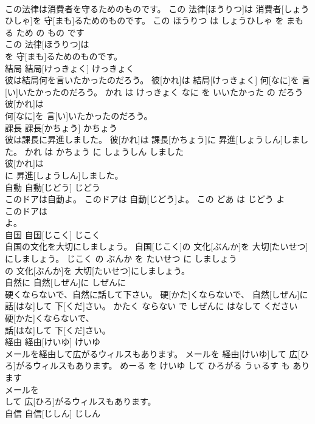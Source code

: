 \documentclass[8pt]{extreport}
\begin{document}
\begin{CJK}{UTF8}{min}
\\	この法律は消費者を守るためのものです。	この 法律[ほうりつ]は 消費者[しょうひしゃ]を 守[まも]るためのものです。	この ほうりつ は しょうひしゃ を まもる ため の もの です	
\\	この 法律[ほうりつ]は
\\	を 守[まも]るためのものです。			
\\	結局	結局[けっきょく]	けっきょく	
\\	彼は結局何を言いたかったのだろう。	彼[かれ]は 結局[けっきょく] 何[なに]を 言[い]いたかったのだろう。	かれ は けっきょく なに を いいたかった の だろう	
\\	彼[かれ]は
\\	何[なに]を 言[い]いたかったのだろう。			
\\	課長	課長[かちょう]	かちょう	
\\	彼は課長に昇進しました。	彼[かれ]は 課長[かちょう]に 昇進[しょうしん]しました。	かれ は かちょう に しょうしん しました	
\\	彼[かれ]は
\\	に 昇進[しょうしん]しました。			
\\	自動	自動[じどう]	じどう	
\\	このドアは自動よ。	このドアは 自動[じどう]よ。	この どあ は じどう よ	
\\	このドアは
\\	よ。			
\\	自国	自国[じこく]	じこく	
\\	自国の文化を大切にしましょう。	自国[じこく]の 文化[ぶんか]を 大切[たいせつ]にしましょう。	じこく の ぶんか を たいせつ に しましょう	
\\	の 文化[ぶんか]を 大切[たいせつ]にしましょう。			
\\	自然に	自然[しぜん]に	しぜんに	
\\	硬くならないで、自然に話して下さい。	硬[かた]くならないで、 自然[しぜん]に 話[はな]して 下[くだ]さい。	かたく ならない で しぜんに はなして ください	
\\	硬[かた]くならないで、
\\	話[はな]して 下[くだ]さい。			
\\	経由	経由[けいゆ]	けいゆ	
\\	メールを経由して広がるウィルスもあります。	メールを 経由[けいゆ]して 広[ひろ]がるウィルスもあります。	めーる を けいゆ して ひろがる うぃるす も あります	
\\	メールを
\\	して 広[ひろ]がるウィルスもあります。			
\\	自信	自信[じしん]	じしん	

\end{CJK}
\end{document}
